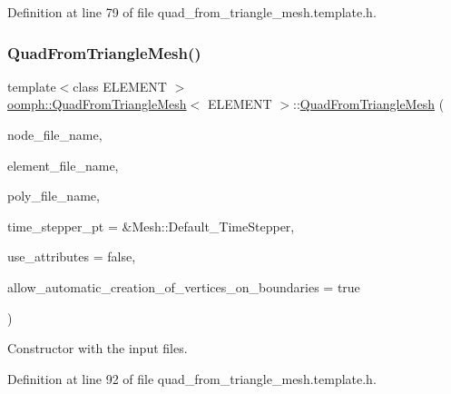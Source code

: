 Definition at line 79 of file quad\+\_\+from\+\_\+triangle\+\_\+mesh.\+template.\+h.

\mbox{\label{classoomph_1_1QuadFromTriangleMesh_ab6fd5b49a1c1a4b29fc000953b732b98}} 
\subsubsection{\texorpdfstring{Quad\+From\+Triangle\+Mesh()}{QuadFromTriangleMesh()}\hspace{0.1cm}{\footnotesize\ttfamily [2/4]}}
{\footnotesize\ttfamily template$<$class E\+L\+E\+M\+E\+NT $>$ \\
\hyperlink{classoomph_1_1QuadFromTriangleMesh}{oomph\+::\+Quad\+From\+Triangle\+Mesh}$<$ E\+L\+E\+M\+E\+NT $>$\+::\hyperlink{classoomph_1_1QuadFromTriangleMesh}{Quad\+From\+Triangle\+Mesh} (\begin{DoxyParamCaption}\item[{const std\+::string \&}]{node\+\_\+file\+\_\+name,  }\item[{const std\+::string \&}]{element\+\_\+file\+\_\+name,  }\item[{const std\+::string \&}]{poly\+\_\+file\+\_\+name,  }\item[{Time\+Stepper $\ast$}]{time\+\_\+stepper\+\_\+pt = {\ttfamily \&Mesh\+:\+:Default\+\_\+TimeStepper},  }\item[{const bool \&}]{use\+\_\+attributes = {\ttfamily false},  }\item[{const bool \&}]{allow\+\_\+automatic\+\_\+creation\+\_\+of\+\_\+vertices\+\_\+on\+\_\+boundaries = {\ttfamily true} }\end{DoxyParamCaption})\hspace{0.3cm}{\ttfamily [inline]}}



Constructor with the input files. 



Definition at line 92 of file quad\+\_\+from\+\_\+triangle\+\_\+mesh.\+template.\+h.

\mbox{\label{classoomph_1_1QuadFromTriangleMesh_a78f9c12882d4554e4484255640b6bf51}} 
